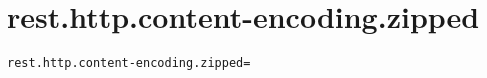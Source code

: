 \section{rest.http.content-encoding.zipped}
\label{configuration:RestHttpContentEncodingZipped}
\ClearAPI
\TODO
\begin{lstlisting}[style=Props,caption={Usage example for \textit{rest.http.content-encoding.zipped}}]
rest.http.content-encoding.zipped=
\end{lstlisting}